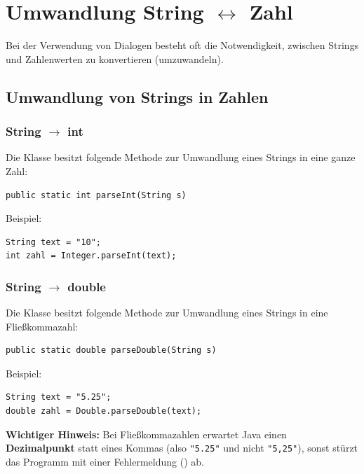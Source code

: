 \section{Umwandlung String $\leftrightarrow$ Zahl}

Bei der Verwendung von Dialogen besteht oft die Notwendigkeit, zwischen Strings
und Zahlenwerten zu konvertieren (umzuwandeln).

\subsection{Umwandlung von Strings in Zahlen}

\subsubsection{String $\rightarrow$ int}

Die Klasse  besitzt folgende Methode zur Umwandlung eines
Strings in eine ganze Zahl:

\begin{lstlisting}
public static int parseInt(String s)
\end{lstlisting}

Beispiel:

\begin{lstlisting}
String text = "10";
int zahl = Integer.parseInt(text);
\end{lstlisting}


\subsubsection{String $\rightarrow$ double}

Die Klasse  besitzt folgende Methode zur Umwandlung eines
Strings in eine Fließkommazahl:

\begin{lstlisting}
public static double parseDouble(String s)
\end{lstlisting}

Beispiel:

\begin{lstlisting}
String text = "5.25";
double zahl = Double.parseDouble(text);
\end{lstlisting}

\noindent \textbf{Wichtiger Hinweis:} Bei Fließkommazahlen erwartet Java einen
\textbf{Dezimalpunkt} statt eines Kommas (also \verb|"5.25"| und nicht
\verb|"5,25"|), sonst stürzt das Programm mit einer Fehlermeldung
() ab.


